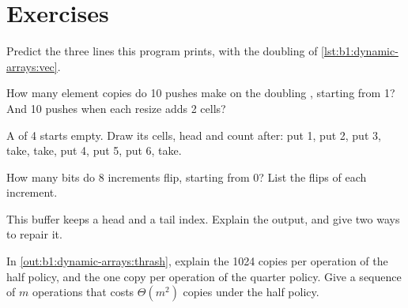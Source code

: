 \section{Exercises}\label{sec:b1:dynamic-arrays:exercises}

\begin{exercise}[$\star$]\label{exo:b1:dynamic-arrays:1}
Predict the three lines this program prints, with the doubling  of \cref{lst:b1:dynamic-arrays:vec}.
\end{exercise}

\begin{exercise}[$\star$]\label{exo:b1:dynamic-arrays:2}
How many element copies do 10 pushes make on the doubling , starting from  1? And 10 pushes when each
resize adds 2 cells?
\end{exercise}

\begin{exercise}[$\star$]\label{exo:b1:dynamic-arrays:3}
A  of  4 starts empty. Draw its cells, head and count after: put 1, put 2, put 3, take, take,
put 4, put 5, put 6, take.
\end{exercise}

\begin{exercise}[$\star$]\label{exo:b1:dynamic-arrays:4}
How many bits do 8 increments flip, starting from 0? List the flips of each increment.
\end{exercise}

\begin{exercise}[$\star\star$]\label{exo:b1:dynamic-arrays:5}
This buffer keeps a head and a tail index. Explain the output, and give two ways to repair it.
\end{exercise}

\begin{exercise}[$\star\star$]\label{exo:b1:dynamic-arrays:6}
In \cref{out:b1:dynamic-arrays:thrash}, explain the 1024 copies per operation of the half policy, and the one copy per
operation of the quarter policy. Give a sequence of $m$ operations that costs $\Theta(m^2)$ copies under the half
policy.
\end{exercise}

